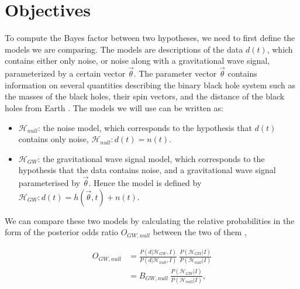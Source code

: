\documentclass{article}
\begin{document}
 
 
 
 \section{Objectives}
 


To compute the Bayes factor between two hypotheses, we need to first define the models we are comparing. The models are descriptions of the data $d(t)$, which contains either only noise, or noise along with a gravitational wave signal, parameterized by a certain vector $\vec{\theta}$. The parameter vector $\vec{\theta}$ contains information on several quantities describing the binary black hole system such as the masses of the black holes, their spin vectors, and the distance of the black holes from Earth \cite{BaeStats}. The models we will use can be written as:

 



\begin{itemize}
	\item $\mathcal{H}_{null}$: the noise model, which corresponds to the hypothesis that $d(t)$ contains only noise,
	$\mathcal{H}_{null}: d(t) = n(t)$.
	\item $\mathcal{H}_{GW}$: the gravitational wave signal model, which corresponds to the hypothesis that the data contains noise, and a gravitational wave signal parameterised by $\vec{\theta}$. Hence the model is defined by $\mathcal{H}_{GW}: d(t) = h(\vec{\theta},t) + n(t)$.
\end{itemize}
 
 
We can compare these two models by calculating the relative probabilities in the form of the posterior odds ratio $O_{GW, null}$ between the two of them \cite{BaeStats}, 
  
  \begin{align} \label{eq:relProb}
  O_{GW, null} &= \frac{P(d|  \mathcal{H}_{GW},I)}{P(d|  \mathcal{H}_{null},I)} \  \frac{P(\mathcal{H}_{GW}|I) }{P(\mathcal{H}_{null}|I)}  \nonumber\\
  &= B_{GW, null} \ \frac{P( \mathcal{H}_{GW}|I) }{P( \mathcal{H}_{null}|I)},
  \end{align} 
  
\end{document}
